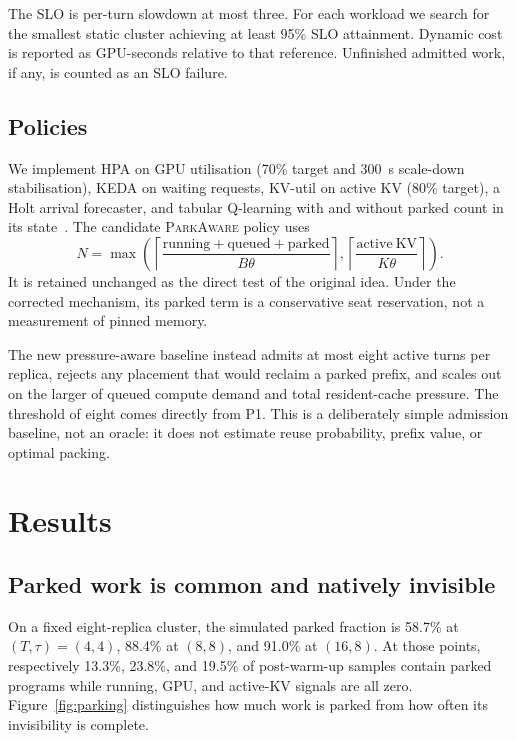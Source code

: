 \documentclass[sigconf,nonacm]{acmart}
\newcommand{\sys}{\textsc{ParkAware}\xspace}
\begin{document}
The SLO is per-turn slowdown at most three. For each workload we search for the
smallest static cluster achieving at least 95\% SLO attainment. Dynamic cost is
reported as GPU-seconds relative to that reference. Unfinished admitted work,
if any, is counted as an SLO failure.

\subsection{Policies}

We implement HPA on GPU utilisation (70\% target and 300~s scale-down
stabilisation), KEDA on waiting requests, KV-util on active KV (80\% target),
a Holt arrival forecaster, and tabular Q-learning with and without parked count
in its state~\cite{gari,barrett}. The candidate \sys policy uses
\begin{equation}
N=\max\!\left(
\left\lceil\frac{\mathrm{running}+\mathrm{queued}+\mathrm{parked}}
{B\theta}\right\rceil,
\left\lceil\frac{\mathrm{active\ KV}}{K\theta}\right\rceil\right).
\label{eq:parkaware}
\end{equation}
It is retained unchanged as the direct test of the original idea. Under the
corrected mechanism, its parked term is a conservative seat reservation, not a
measurement of pinned memory.

The new pressure-aware baseline instead admits at most eight active turns per
replica, rejects any placement that would reclaim a parked prefix, and scales
out on the larger of queued compute demand and total resident-cache pressure.
The threshold of eight comes directly from P1. This is a deliberately simple
admission baseline, not an oracle: it does not estimate reuse probability,
prefix value, or optimal packing.

\section{Results}

\subsection{Parked work is common and natively invisible}

On a fixed eight-replica cluster, the simulated parked fraction is 58.7\% at
$(T,\tau)=(4,4)$, 88.4\% at $(8,8)$, and 91.0\% at $(16,8)$.
At those points, respectively 13.3\%, 23.8\%, and 19.5\% of post-warm-up
samples contain parked programs while running, GPU, and active-KV signals are
all zero. Figure~\ref{fig:parking} distinguishes how much work is parked from
how often its invisibility is complete.
\end{document}
